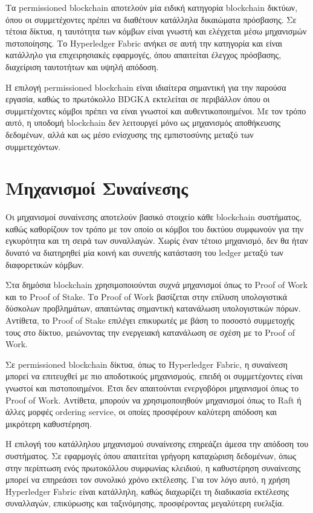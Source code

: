 \documentclass[12pt,a4paper]{report}
\begin{document}
Τα permissioned blockchain αποτελούν μία ειδική κατηγορία blockchain δικτύων, όπου οι συμμετέχοντες πρέπει να διαθέτουν κατάλληλα δικαιώματα πρόσβασης. Σε τέτοια δίκτυα, η ταυτότητα των κόμβων είναι γνωστή και ελέγχεται μέσω μηχανισμών πιστοποίησης. Το Hyperledger Fabric ανήκει σε αυτή την κατηγορία και είναι κατάλληλο για επιχειρησιακές εφαρμογές, όπου απαιτείται έλεγχος πρόσβασης, διαχείριση ταυτοτήτων και υψηλή απόδοση.

Η επιλογή permissioned blockchain είναι ιδιαίτερα σημαντική για την παρούσα εργασία, καθώς το πρωτόκολλο BDGKA εκτελείται σε περιβάλλον όπου οι συμμετέχοντες κόμβοι πρέπει να είναι γνωστοί και αυθεντικοποιημένοι. Με τον τρόπο αυτό, η υποδομή blockchain δεν λειτουργεί μόνο ως μηχανισμός αποθήκευσης δεδομένων, αλλά και ως μέσο ενίσχυσης της εμπιστοσύνης μεταξύ των συμμετεχόντων.

\section{Μηχανισμοί Συναίνεσης}

Οι μηχανισμοί συναίνεσης αποτελούν βασικό στοιχείο κάθε blockchain συστήματος, καθώς καθορίζουν τον τρόπο με τον οποίο οι κόμβοι του δικτύου συμφωνούν για την εγκυρότητα και τη σειρά των συναλλαγών. Χωρίς έναν τέτοιο μηχανισμό, δεν θα ήταν δυνατό να διατηρηθεί μία κοινή και συνεπής κατάσταση του ledger μεταξύ των διαφορετικών κόμβων.

Στα δημόσια blockchain χρησιμοποιούνται συχνά μηχανισμοί όπως το Proof of Work και το Proof of Stake. Το Proof of Work βασίζεται στην επίλυση υπολογιστικά δύσκολων προβλημάτων, απαιτώντας σημαντική κατανάλωση υπολογιστικών πόρων. Αντίθετα, το Proof of Stake επιλέγει επικυρωτές με βάση το ποσοστό συμμετοχής τους στο δίκτυο, μειώνοντας την ενεργειακή κατανάλωση σε σχέση με το Proof of Work.

Σε permissioned blockchain δίκτυα, όπως το Hyperledger Fabric, η συναίνεση μπορεί να επιτευχθεί με πιο αποδοτικούς μηχανισμούς, επειδή οι συμμετέχοντες είναι γνωστοί και πιστοποιημένοι. Έτσι δεν απαιτούνται ενεργοβόροι μηχανισμοί όπως το Proof of Work. Αντίθετα, μπορούν να χρησιμοποιηθούν μηχανισμοί όπως το Raft ή άλλες μορφές ordering service, οι οποίες προσφέρουν καλύτερη απόδοση και μικρότερη καθυστέρηση.

Η επιλογή του κατάλληλου μηχανισμού συναίνεσης επηρεάζει άμεσα την απόδοση του συστήματος. Σε εφαρμογές όπου απαιτείται γρήγορη καταχώριση δεδομένων, όπως στην περίπτωση ενός πρωτοκόλλου συμφωνίας κλειδιού, η καθυστέρηση συναίνεσης μπορεί να επηρεάσει τον συνολικό χρόνο εκτέλεσης. Για τον λόγο αυτό, η χρήση Hyperledger Fabric είναι κατάλληλη, καθώς διαχωρίζει τη διαδικασία εκτέλεσης συναλλαγών, επικύρωσης και ταξινόμησης, προσφέροντας μεγαλύτερη ευελιξία.
\end{document}
